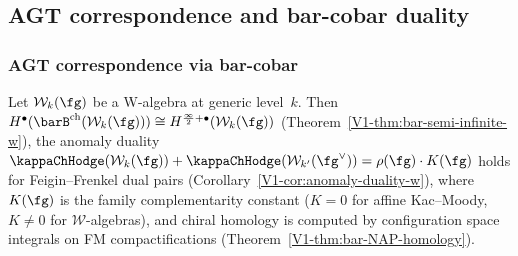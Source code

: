 
\subsection{AGT correspondence and bar-cobar duality}
\label{sec:mathematical-bridges}



\subsubsection{AGT correspondence via bar-cobar}

\begin{theorem}[AGT 2D side: bar complex = semi-infinite complex]
\label{thm:agt-2d-bar}
Let $\mathcal{W}_k(\fg)$ be a W-algebra at generic level~$k$. Then $H^\bullet(\barB^{\mathrm{ch}}(\mathcal{W}_k(\fg))) \cong H^{\frac{\infty}{2}+\bullet}(\mathcal{W}_k(\fg))$ (Theorem~\ref*{V1-thm:bar-semi-infinite-w}), the anomaly duality $\kappaChHodge(\mathcal{W}_k(\fg)) + \kappaChHodge(\mathcal{W}_{k'}(\fg^\vee)) = \rho(\fg) \cdot K(\fg)$ holds for Feigin--Frenkel dual pairs (Corollary~\ref*{V1-cor:anomaly-duality-w}), where $K(\fg)$ is the family complementarity constant ($K = 0$ for affine Kac--Moody, $K \neq 0$ for $\mathcal{W}$-algebras), and chiral homology is computed by configuration space integrals on FM compactifications (Theorem~\ref*{V1-thm:bar-NAP-homology}).
\end{theorem}

